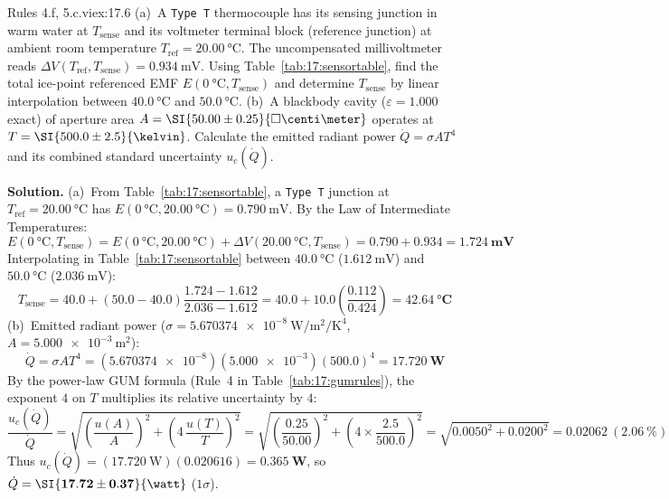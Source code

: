 \begin{workedexample}{Rules 4.f, 5.c.vi}{ex:17.6}
(a)~A \texttt{Type T} thermocouple has its sensing junction in warm water at $T_{\mathrm{sense}}$ and its voltmeter terminal block (reference junction) at ambient room temperature $T_{\mathrm{ref}} = \SI{20.00}{\celsius}$. The uncompensated millivoltmeter reads $\Delta V(T_{\mathrm{ref}}, T_{\mathrm{sense}}) = \SI{+0.934}{\milli\volt}$. Using Table~\ref{tab:17:sensortable}, find the total ice-point referenced EMF $E(\SI{0}{\celsius}, T_{\mathrm{sense}})$ and determine $T_{\mathrm{sense}}$ by linear interpolation between $\SI{40.0}{\celsius}$ and $\SI{50.0}{\celsius}$.
(b)~A blackbody cavity ($\varepsilon = 1.000$ exact) of aperture area $A = \SI{50.00 \pm 0.25}{\square\centi\meter}$ operates at $T = \SI{500.0 \pm 2.5}{\kelvin}$. Calculate the emitted radiant power $\dot{Q} = \sigma A T^4$ and its combined standard uncertainty $u_c(\dot{Q})$.
\par\smallskip\noindent
\textbf{Solution.}
(a)~From Table~\ref{tab:17:sensortable}, a \texttt{Type T} junction at $T_{\mathrm{ref}} = \SI{20.00}{\celsius}$ has $E(\SI{0}{\celsius}, \SI{20.00}{\celsius}) = \SI{+0.790}{\milli\volt}$. By the Law of Intermediate Temperatures:
$$E(\SI{0}{\celsius}, T_{\mathrm{sense}}) = E(\SI{0}{\celsius}, \SI{20.00}{\celsius}) + \Delta V(\SI{20.00}{\celsius}, T_{\mathrm{sense}}) = 0.790 + 0.934 = \mathbf{\SI{+1.724}{\milli\volt}}$$
Interpolating in Table~\ref{tab:17:sensortable} between $\SI{40.0}{\celsius}$ ($\SI{1.612}{\milli\volt}$) and $\SI{50.0}{\celsius}$ ($\SI{2.036}{\milli\volt}$):
$$T_{\mathrm{sense}} = 40.0 + (50.0 - 40.0)\frac{1.724 - 1.612}{2.036 - 1.612} = 40.0 + 10.0\left(\frac{0.112}{0.424}\right) = \mathbf{\SI{42.64}{\celsius}}$$
(b)~Emitted radiant power ($\sigma = \SI{5.670374e-8}{\watt\per\square\meter\per\kelvin\tothe{4}}$, $A = \SI{5.000e-3}{\square\meter}$):
$$\dot{Q} = \sigma A T^4 = (\num{5.670374e-8})(\num{5.000e-3})(500.0)^4 = \mathbf{\SI{17.720}{\watt}}$$
By the power-law GUM formula (Rule~4 in Table~\ref{tab:17:gumrules}), the exponent $4$ on $T$ multiplies its relative uncertainty by $4$:
$$\frac{u_c(\dot{Q})}{\dot{Q}} = \sqrt{\left(\frac{u(A)}{A}\right)^2 + \left(4\,\frac{u(T)}{T}\right)^2} = \sqrt{\left(\frac{0.25}{50.00}\right)^2 + \left(4\times\frac{2.5}{500.0}\right)^2} = \sqrt{0.0050^2 + 0.0200^2} = \mathbf{0.02062}\ (\SI{2.06}{\percent})$$
Thus $u_c(\dot{Q}) = (\SI{17.720}{\watt})(0.020616) = \mathbf{\SI{0.365}{\watt}}$, so $\dot{Q} = \mathbf{\SI{17.72 \pm 0.37}{\watt}}$ ($1\sigma$).
\end{workedexample}

